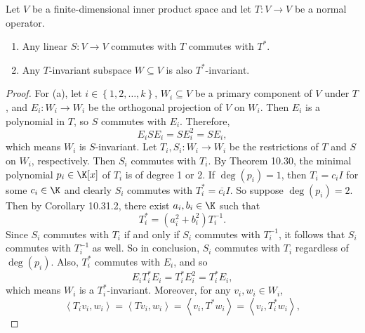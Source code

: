 \documentclass[linearalgebra]{subfiles}
\begin{document}
    \begin{prop}{}
        Let $V$ be a finite-dimensional inner product space and let $T:V\to V$ be a normal operator. 
        \begin{enumerate}
            \item Any linear $S:V\to V$ commutes with $T$ commutes with $T^{*}$.
            \item Any $T$-invariant subspace $W\subseteq V$ is also $T^{*}$-invariant.
        \end{enumerate}
    \end{prop}

    \begin{proof}
        For (a), let $i\in\left\lbrace 1,2,\ldots,k \right\rbrace$, $W_i\subseteq V$ be a primary component of $V$ under $T$, and $E_i:W_i\to W_i$ be the orthogonal projection of $V$ on $W_i$. Then $E_i$ is a polynomial in $T$, so $S$ commutes with $E_i$. Therefore,
        \begin{equation*}
            E_iSE_i = SE_i^{2} = SE_i,
        \end{equation*}
        which means $W_i$ is $S$-invariant. Let $T_i, S_i:W_i\to W_i$ be the restrictions of $T$ and $S$ on $W_i$, respectively. Then $S_i$ commutes with $T_i$. By Theorem 10.30, the minimal polynomial $p_i\in\K[x]$ of $T_i$ is of degree 1 or 2. If $\deg\left( p_i \right) = 1$, then $T_i=c_iI$ for some $c_i\in\K$ and clearly $S_i$ commutes with $T_i^{*} = \overline{c_i}I$. So suppose $\deg\left( p_i \right) = 2$. Then by Corollary 10.31.2, there exist $a_i,b_i\in\K$ such that
        \begin{equation*}
            T_i^{*} = \left( a_i^{2} + b_i^{2}  \right) T_i^{-1} .
        \end{equation*}
        Since $S_i$ commutes with $T_i$ if and only if $S_i$ commutes with $T_i^{-1}$, it follows that $S_i$ commutes with $T_i^{-1}$ as well. So in conclusion, $S_i$ commutes with $T_i$ regardless of $\deg\left( p_i \right)$. Also, $T_i^{*}$ commutes with $E_i$, and so
        \begin{equation*}
            E_iT_i^{*}E_i = T_i^{*} E_i^2 = T_i^{*} E_i, 
        \end{equation*}
        which means $W_i$ is a $T_i^{*}$-invariant. Moreover, for any $v_i,w_i\in W_i$,
        \begin{equation*}
            \left\langle T_iv_i, w_i\right\rangle = \left\langle Tv_i, w_i\right\rangle = \left\langle v_i, T^{*} w_i\right\rangle = \left\langle v_i, T_i^{*} w_i\right\rangle ,
        \end{equation*}

\end{proof}
\end{document}
